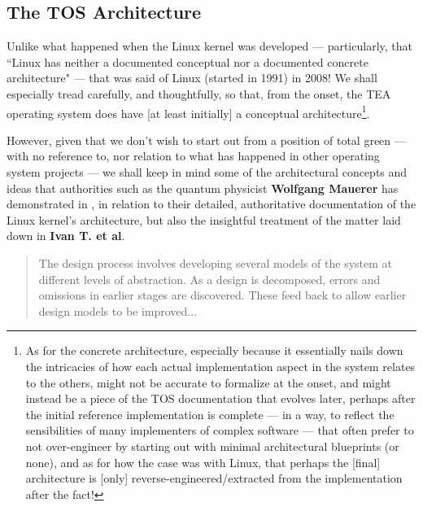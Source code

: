 \documentclass[a4paper, 18pt]{book} %
\begin{document}
{{{\subsection{The TOS Architecture}


Unlike what happened when the Linux kernel was developed --- particularly, that ``Linux has neither a documented conceptual nor a documented concrete architecture"\cite{Bowman:1999:Linux} --- that was said of Linux (started in 1991) in 2008! We shall especially tread carefully, and thoughtfully, so that, from the onset, the TEA operating system does have [at least initially] a conceptual architecture\footnote{As for the concrete architecture, especially because it essentially nails down the intricacies of how each actual implementation aspect in the system relates to the others, might not be accurate to formalize at the onset, and might instead be a piece of the TOS documentation that evolves later, perhaps after the initial reference implementation is complete --- in a way, to reflect the sensibilities of many implementers of complex software --- that often prefer to not over-engineer by starting out with minimal architectural blueprints (or none), and as for how the case was with Linux, that perhaps the [final] architecture is [only] reverse-engineered/extracted from the implementation\cite{Bowman:1999:Linux} after the fact!}.

\vspace{2em}

However, given that we don't wish to start out from a position of total green --- with no reference to, nor relation to what has happened in other operating system projects --- we shall keep in mind some of the architectural concepts and ideas that authorities such as the quantum physicist \textbf{Wolfgang Mauerer} has demonstrated in \cite{Mauerer2008Linux}, in relation to their detailed, authoritative documentation of the Linux kernel's architecture, but also the insightful treatment of the matter laid down in \textbf{Ivan T. et al}\cite{Bowman:1999:Linux}.



\noindent
\begin{minipage}{1\textwidth}
\vspace{2em}
\begin{quotation}
{\ttfamily 

The design process involves developing several models of the system at different levels of abstraction. As a design is decomposed, errors and omissions in earlier stages are discovered. These feed back to allow earlier design models to be improved...

}
\end{quotation}
\end{minipage}}}}
\end{document}

